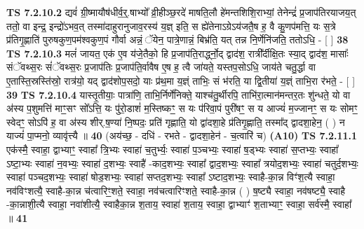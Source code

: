 \documentclass[17pt]{extarticle}
\begin{document}
                  \newline
                                \textbf{ TS 7.2.10.2} \newline
                  द्यवं॑ ग्री॒ष्मायौष॑धीर्व॒र्॒.षाभ्यो᳚ व्री॒हीञ्छ॒रदे॑ माषति॒लौ हे॑मन्तशिशि॒राभ्यां॒ तेनेन्द्रं॑ प्र॒जाप॑तिरयाजय॒त् ततो॒ वा इन्द्र॒ इन्द्रो॑ऽभव॒त् तस्मा॑दाहुरानुजाव॒रस्य॑ य॒ज्ञ् इति॒ स ह्ये॑तेनाऽग्रेऽय॑जतै॒ष ह॒ वै कु॒णप॑मत्ति॒ यः स॒त्रे प्र॑तिगृ॒ह्णाति॑ पुरुषकुण॒पम॑श्वकुण॒पं गौर्वा अन्नं॒ ॅयेन॒ पात्रे॒णान्नं॒ बिभ्र॑ति॒ यत् तन्न नि॒र्णेनि॑जति॒ ततोऽधि॒ - [  ] \textbf{  38} \newline
                  \newline
                                \textbf{ TS 7.2.10.3} \newline
                  मलं॑ जायत॒ एक॑ ए॒व य॑जे॒तैको॒ हि प्र॒जाप॑ति॒रार्द्ध्नो॒द् द्वाद॑श॒ रात्री᳚र्दीक्षि॒तः स्या॒द् द्वाद॑श॒ मासाः᳚ संॅवथ्स॒रः सं॑ॅवथ्स॒रः प्र॒जाप॑तिः प्र॒जाप॑ति॒र्वावैष ए॒ष ह॒ त्वै जा॑यते॒ यस्तप॒सोऽधि॒ जाय॑ते चतु॒र्द्धा वा ए॒तास्ति॒स्रस्ति॑स्रो॒ रात्र॑यो॒ यद् द्वाद॑शोप॒सदो॒ याः प्र॑थ॒मा य॒ज्ञ्ं ताभिः॒ सं भ॑रति॒ या द्वि॒तीया॑ य॒ज्ञ्ं ताभि॒रा र॑भते॒ - [  ] \textbf{  39} \newline
                  \newline
                                \textbf{ TS 7.2.10.4} \newline
                  यास्तृ॒तीयाः॒ पात्रा॑णि॒ ताभि॒र्निर्णे॑निक्ते॒ याश्च॑तु॒र्थीरपि॒ ताभि॑रा॒त्मान॑मन्तर॒तः शु॑न्धते॒ यो वा अ॑स्य प॒शुमत्ति॑ माꣳ॒॒सꣳ सो᳚ऽत्ति॒ यः पु॑रो॒डाशं॑ म॒स्तिष्कꣳ॒॒ स यः प॑रिवा॒पं पुरी॑षꣳ॒॒ स य आज्यं॑ म॒ज्जानꣳ॒॒ स यः सोमꣳ॒॒ स्वेदꣳ॒॒ सोऽपि॑ ह॒ वा अ॑स्य शीर्.ष॒ण्या॑ नि॒ष्पदः॒ प्रति॑ गृह्णाति॒ यो द्वा॑दशा॒हे प्र॑तिगृ॒ह्णाति॒ तस्मा᳚द् द्वादशा॒हेन॒ ( ) न याज्यं॑ पा॒प्मनो॒ व्यावृ॑त्त्यै ॥ \textbf{  40} \newline
                  \newline
                      (अय॑च्छ॒ - दधि॑ - रभते - द्वादशा॒हेन॑ - च॒त्वारि॑ च)  \textbf{(A10)} \newline \newline
                                        \textbf{ TS 7.2.11.1} \newline
                  एक॑स्मै॒ स्वाहा॒ द्वाभ्याꣳ॒॒ स्वाहा᳚ त्रि॒भ्यः स्वाहा॑ च॒तुर्भ्यः॒ स्वाहा॑ प॒ञ्चभ्यः॒ स्वाहा॑ ष॒ड्भ्यः स्वाहा॑ स॒प्तभ्यः॒ स्वाहा᳚ ऽष्टा॒भ्यः स्वाहा॑ न॒वभ्यः॒ स्वाहा॑ द॒शभ्यः॒ स्वाहै॑ -काद॒शभ्यः॒ स्वाहा᳚ द्वाद॒शभ्यः॒ स्वाहा᳚ त्रयोद॒शभ्यः॒ स्वाहा॑ चतुर्द॒शभ्यः॒ स्वाहा॑ पञ्चद॒शभ्यः॒ स्वाहा॑ षोड॒शभ्यः॒ स्वाहा॑ सप्तद॒शभ्यः॒ स्वाहा᳚ ऽष्टाद॒शभ्यः॒ स्वाहै-का॒न्न विꣳ॑श॒त्यै स्वाहा॒ नव॑विꣳशत्यै॒ स्वाहै-का॒न्न च॑त्वारिꣳ॒॒शते॒ स्वाहा॒ नव॑चत्वारिꣳशते॒ स्वाहै-का॒न्न ( ) ष॒ष्ट्यै स्वाहा॒ नव॑षष्ट्यै॒ स्वाहै -का॒न्नाशी॒त्यै स्वाहा॒ नवा॑शीत्यै॒ स्वाहैका॒न्न श॒ताय॒ स्वाहा॑ श॒ताय॒ स्वाहा॒ द्वाभ्याꣳ॑ श॒ताभ्याꣳ॒॒ स्वाहा॒ सर्व॑स्मै॒ स्वाहा᳚ ॥ \textbf{  41} \newline
\end{document}
